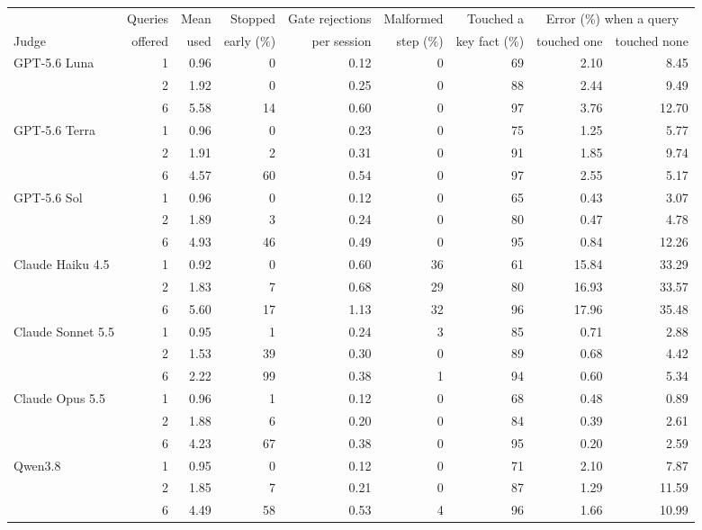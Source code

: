 \begin{tabular}{lrrrrrrrr}
\toprule
 & Queries & Mean & Stopped & Gate rejections & Malformed & Touched a & \multicolumn{2}{c}{Error (\%) when a query} \\
Judge & offered & used & early (\%) & per session & step (\%) & key fact (\%) & touched one & touched none \\
\midrule
GPT-5.6 Luna & 1 & 0.96 & 0 & 0.12 & 0 & 69 & 2.10 & 8.45 \\
 & 2 & 1.92 & 0 & 0.25 & 0 & 88 & 2.44 & 9.49 \\
 & 6 & 5.58 & 14 & 0.60 & 0 & 97 & 3.76 & 12.70 \\
\addlinespace
GPT-5.6 Terra & 1 & 0.96 & 0 & 0.23 & 0 & 75 & 1.25 & 5.77 \\
 & 2 & 1.91 & 2 & 0.31 & 0 & 91 & 1.85 & 9.74 \\
 & 6 & 4.57 & 60 & 0.54 & 0 & 97 & 2.55 & 5.17 \\
\addlinespace
GPT-5.6 Sol & 1 & 0.96 & 0 & 0.12 & 0 & 65 & 0.43 & 3.07 \\
 & 2 & 1.89 & 3 & 0.24 & 0 & 80 & 0.47 & 4.78 \\
 & 6 & 4.93 & 46 & 0.49 & 0 & 95 & 0.84 & 12.26 \\
\addlinespace
Claude Haiku 4.5 & 1 & 0.92 & 0 & 0.60 & 36 & 61 & 15.84 & 33.29 \\
 & 2 & 1.83 & 7 & 0.68 & 29 & 80 & 16.93 & 33.57 \\
 & 6 & 5.60 & 17 & 1.13 & 32 & 96 & 17.96 & 35.48 \\
\addlinespace
Claude Sonnet 5.5 & 1 & 0.95 & 1 & 0.24 & 3 & 85 & 0.71 & 2.88 \\
 & 2 & 1.53 & 39 & 0.30 & 0 & 89 & 0.68 & 4.42 \\
 & 6 & 2.22 & 99 & 0.38 & 1 & 94 & 0.60 & 5.34 \\
\addlinespace
Claude Opus 5.5 & 1 & 0.96 & 1 & 0.12 & 0 & 68 & 0.48 & 0.89 \\
 & 2 & 1.88 & 6 & 0.20 & 0 & 84 & 0.39 & 2.61 \\
 & 6 & 4.23 & 67 & 0.38 & 0 & 95 & 0.20 & 2.59 \\
\addlinespace
Qwen3.8 & 1 & 0.95 & 0 & 0.12 & 0 & 71 & 2.10 & 7.87 \\
 & 2 & 1.85 & 7 & 0.21 & 0 & 87 & 1.29 & 11.59 \\
 & 6 & 4.49 & 58 & 0.53 & 4 & 96 & 1.66 & 10.99 \\
\bottomrule
\end{tabular}
